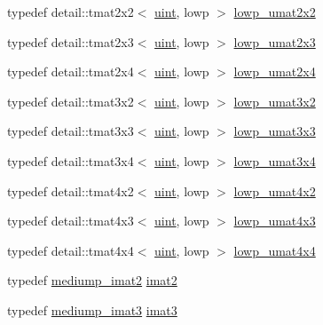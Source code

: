 \begin{CompactItemize}
\item 
typedef detail::tmat2x2$<$ \hyperlink{group__core__precision_g4fd29415871152bfb5abd588334147c8}{uint}, lowp $>$ \hyperlink{group__gtc__matrix__integer_ga4dfe67706187e459004b9a6c500b048}{lowp\_\-umat2x2}
\item 
typedef detail::tmat2x3$<$ \hyperlink{group__core__precision_g4fd29415871152bfb5abd588334147c8}{uint}, lowp $>$ \hyperlink{group__gtc__matrix__integer_g4c8388c4a03f228c0e12dd7b7445115d}{lowp\_\-umat2x3}
\item 
typedef detail::tmat2x4$<$ \hyperlink{group__core__precision_g4fd29415871152bfb5abd588334147c8}{uint}, lowp $>$ \hyperlink{group__gtc__matrix__integer_g581eef861234e918e88377fd331e37e6}{lowp\_\-umat2x4}
\item 
typedef detail::tmat3x2$<$ \hyperlink{group__core__precision_g4fd29415871152bfb5abd588334147c8}{uint}, lowp $>$ \hyperlink{group__gtc__matrix__integer_g5874e964b1816f230215df28d22ea7de}{lowp\_\-umat3x2}
\item 
typedef detail::tmat3x3$<$ \hyperlink{group__core__precision_g4fd29415871152bfb5abd588334147c8}{uint}, lowp $>$ \hyperlink{group__gtc__matrix__integer_g691694b1a4c6d1e613d8f1f707acc829}{lowp\_\-umat3x3}
\item 
typedef detail::tmat3x4$<$ \hyperlink{group__core__precision_g4fd29415871152bfb5abd588334147c8}{uint}, lowp $>$ \hyperlink{group__gtc__matrix__integer_gd44577fcaebad47da39cc244566d7fe3}{lowp\_\-umat3x4}
\item 
typedef detail::tmat4x2$<$ \hyperlink{group__core__precision_g4fd29415871152bfb5abd588334147c8}{uint}, lowp $>$ \hyperlink{group__gtc__matrix__integer_g7583563f93096623d54ec8fddd806d13}{lowp\_\-umat4x2}
\item 
typedef detail::tmat4x3$<$ \hyperlink{group__core__precision_g4fd29415871152bfb5abd588334147c8}{uint}, lowp $>$ \hyperlink{group__gtc__matrix__integer_g03af6e7ea92be81959305fc89a239cf5}{lowp\_\-umat4x3}
\item 
typedef detail::tmat4x4$<$ \hyperlink{group__core__precision_g4fd29415871152bfb5abd588334147c8}{uint}, lowp $>$ \hyperlink{group__gtc__matrix__integer_g394ee910348beffe9c7d6b694d5efe5f}{lowp\_\-umat4x4}
\item 
typedef \hyperlink{group__gtc__matrix__integer_gec03a8eef2ec2536f8bebffd0bac8192}{mediump\_\-imat2} \hyperlink{group__gtc__matrix__integer_g77a581b3366fb63fc72f8f20830003e0}{imat2}
\item 
typedef \hyperlink{group__gtc__matrix__integer_g6b438ab863af0122b532adc93b89105e}{mediump\_\-imat3} \hyperlink{group__gtc__matrix__integer_g45481922dd07a3a8e23758286311ee97}{imat3}

\end{CompactItemize}
